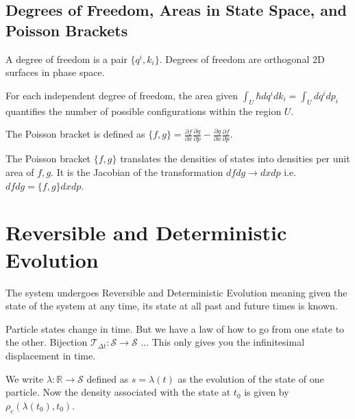 \documentclass{article}
\begin{document}
\subsection{Degrees of Freedom, Areas in State Space, and Poisson Brackets}

\begin{defn}
	A degree of freedom is a pair $\{q^i,k_i\}$. Degrees of freedom are orthogonal 2D surfaces in phase space.
\end{defn}
	
\begin{prop}
	For each independent degree of freedom, the area given $\int_U \hbar dq^i dk_i = \int_U dq^i dp_i$ quantifies the number of possible configurations within the region $U$.
\end{prop}

\begin{defn}
	The Poisson bracket is defined as $\{f,g\} = \frac{\partial f}{\partial x}\frac{\partial g}{\partial p} - \frac{\partial g}{\partial x}\frac{\partial f}{\partial p}$.
\end{defn}

\begin{prop}
	The Poisson bracket $\{f, g\}$ translates the densities of states into densities per unit area of $f, g$. It is the Jacobian of the transformation $dfdg \rightarrow dxdp$ i.e. $dfdg = \{f,g\}dxdp$.
\end{prop}
	
\section{Reversible and Deterministic Evolution}

\begin{assump}
	The system undergoes Reversible and Deterministic Evolution meaning given the state of the system at any time, its state at all past and future times is known.
\end{assump}

Particle states change in time. But we have a law of how to go from one state to the other. Bijection $\mathcal{T}_{\Delta t} : \mathcal{S} \to \mathcal{S}$ ... This only gives you the infinitesimal displacement in time.

\begin{defn}
	We write $\lambda: \mathbb{R} \rightarrow \mathcal{S}$ defined as $s = \lambda(t)$ as the evolution of the state of one particle. Now the density associated with the state at $t_0$ is given by $\rho_c(\lambda(t_0),t_0)$.
\end{defn}
\end{document}
